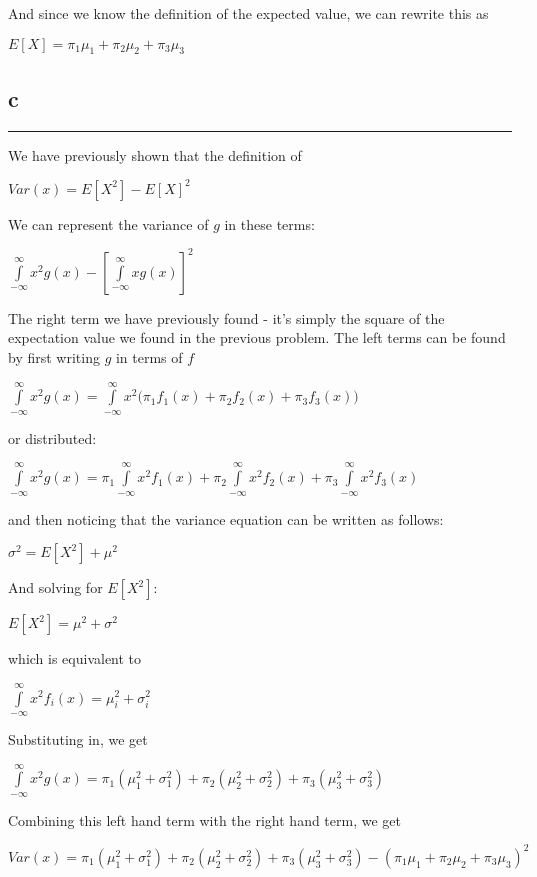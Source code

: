\documentclass[]{tufte-handout}
\begin{document}
And since we know the definition of the expected value, we can rewrite
this as

\(E[X] = \pi_1\mu_1 + \pi_2\mu_2+\pi_3\mu_3\)

\hypertarget{c}{%
\subsection{c}\label{c}}

\begin{center}\rule{0.5\linewidth}{0.5pt}\end{center}

We have previously shown that the definition of

\(Var(x) = E[X^2] - E[X]^2\)

We can represent the variance of \(g\) in these terms:

\(\int\limits_{-\infty}^{\infty}x^2g(x) - [\int\limits_{-\infty}^{\infty}xg(x)]^2\)

The right term we have previously found - it's simply the square of the
expectation value we found in the previous problem. The left terms can
be found by first writing \(g\) in terms of \(f\)

\(\int\limits_{-\infty}^{\infty}x^2g(x) = \int\limits_{-\infty}^{\infty}x^2\Big(\pi_1f_1(x)+\pi_2f_2(x)+\pi_3f_3(x)\Big)\)

or distributed:

\(\int\limits_{-\infty}^{\infty}x^2g(x) = \pi_1\int\limits_{-\infty}^{\infty}x^2f_1(x) + \pi_2\int\limits_{-\infty}^{\infty}x^2f_2(x) + \pi_3\int\limits_{-\infty}^{\infty}x^2f_3(x)\)

and then noticing that the variance equation can be written as follows:

\(\sigma^2 = E[X^2] + \mu^2\)

And solving for \(E[X^2]\):

\(E[X^2] = \mu^2 + \sigma^2\)

which is equivalent to

\(\int\limits_{-\infty}^{\infty}x^2f_i(x) = \mu^2_i + \sigma^2_i\)

Substituting in, we get

\(\int\limits_{-\infty}^{\infty}x^2g(x) = \pi_1(\mu^2_1 + \sigma^2_1) +\pi_2(\mu^2_2 + \sigma^2_2) +\pi_3(\mu^2_3 + \sigma^2_3)\)

Combining this left hand term with the right hand term, we get

\(Var(x) = \pi_1(\mu^2_1 + \sigma^2_1) +\pi_2(\mu^2_2 + \sigma^2_2) +\pi_3(\mu^2_3 + \sigma^2_3) -(\pi_1\mu_1 + \pi_2\mu_2+\pi_3\mu_3)^2\)
\end{document}
